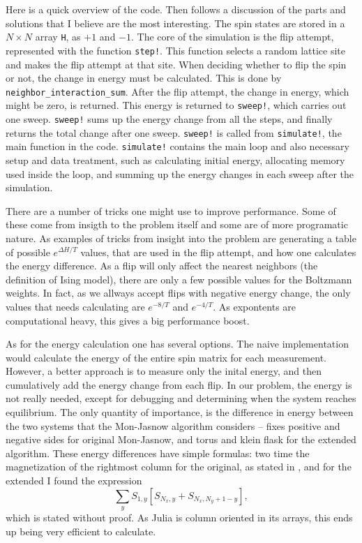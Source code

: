 \documentclass[12pt, a4paper]{article}
\begin{document}
Here is a quick overview of the code.
Then follows a discussion of the parts and solutions that I believe are the most interesting.
The spin states are stored in a $N \times N$ array \verb|H|, as $+1$ and $-1$.
The core of the simulation is the flip attempt, represented with the function \verb|step!|.
This function selects a random lattice site and makes the flip attempt at that site.
When deciding whether to flip the spin or not, the change in energy must be calculated.
This is done by \verb|neighbor_interaction_sum|.
After the flip attempt, the change in energy, which might be zero, is returned.
This energy is returned to \verb|sweep!|, which carries out one sweep.
\verb|sweep!| sums up the energy change from all the steps, and finally returns the total change after one sweep.
\verb|sweep!| is called from \verb|simulate!|, the main function in the code.
\verb|simulate!| contains the main loop and also necessary setup and data treatment, such as calculating initial energy, allocating memory used inside the loop, and summing up the energy changes in each sweep after the simulation.


There are a number of tricks one might use to improve performance.
Some of these come from insigth to the problem itself and some are of more programatic nature.
As examples of tricks from insight into the problem are generating a table of possible $e^{\Delta H/T}$ values, that are used in the flip attempt, and how one calculates the energy difference.
As a flip will only affect the nearest neighbors (the definition of Ising model), there are only a few possible values for the Boltzmann weights.
In fact, as we allways accept flips with negative energy change, the only values that needs calculating are $e^{-8/T}$ and $e^{-4/T}$.
As expontents are computational heavy, this gives a big performance boost.


As for the energy calculation one has several options.
The naive implementation would calculate the energy of the entire spin matrix for each measurement.
However, a better approach is to measure only the inital energy, and then cumulatively add the energy change from each flip.
In our problem, the energy is not really needed, except for debugging and determining when the system reaches equilibrium.
The only quantity of importance, is the difference in energy between the two systems that the Mon-Jasnow algorithm considers -- fixes positive and negative sides for original Mon-Jasnow, and torus and klein flask for the extended algorithm.
These energy differences have simple formulas: two time the magnetization of the rightmost column for the original, as stated in \cite{mon_jasnow}, and for the extended I found the expression
\begin{equation}
  \sum_y S_{1,y} [ S_{N_x, y} + S_{N_x, N_y+1-y} ],
\end{equation}
which is stated without proof.
As Julia is column oriented in its arrays, this ends up being very efficient to calculate.
\end{document}
